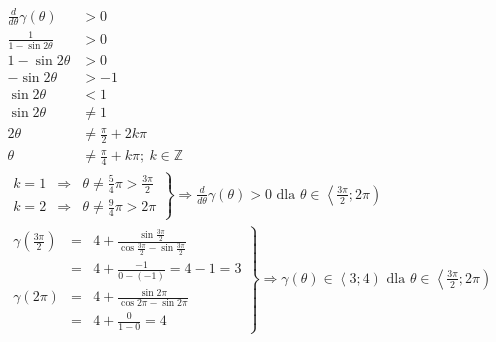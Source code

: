         \begin{align*}
        	\frac{d}{d\theta}\gamma\left( \theta\right)& > 0& \hspace{10cm}\\
        	\frac{
        		1
        	}{
        		1 - \sin 2\theta
        	} & > 0\\
        	1 - \sin 2\theta & > 0\\
        	 -\sin 2\theta & > -1\\
        	 \sin 2\theta & < 1\\
        	 \sin 2\theta & \neq 1\\
        	 2\theta & \neq \frac{\pi}{2} + 2k\pi\\
        	 \theta & \neq \frac{\pi}{4} + k\pi ; \ k \in \mathbb{Z}
        \end{align*}\alignspace
       	\begin{align*}
       		\left. \begin{array}{rcl}
       		 k = 1 & \Rightarrow &\theta \neq \frac{5}{4}\pi > \frac{3\pi}{2}  \\
    	 	 k = 2 & \Rightarrow &\theta \neq \frac{9}{4}\pi > 2\pi
    	 	\end{array}    \right\}\Rightarrow \frac{d}{d\theta}\gamma\left( \theta\right) > 0 \text{ dla } \theta \in \left\langle \frac{3\pi}{2};2\pi\right)& \hspace{10cm}
        \end{align*}\alignspace
       	\begin{align*}
       	\left. \begin{array}{rcl}
       		\gamma\left( \frac{3\pi}{2}\right) & = &
       		 4 + \frac{\sin \frac{3\pi}{2}}{\cos\frac{3\pi}{2} - \sin \frac{3\pi}{2}}\\
       		  & = & 4 + \frac{-1}{0 - \left(-1\right)}= 4 - 1 = 3\\
       		\gamma\left( 2\pi\right) & = &
       		4 + \frac{\sin  2\pi}{\cos  2\pi - \sin 2\pi} \\
       		& = &4 + \frac{0}{1 - 0} = 4
       	\end{array} \right\} \Rightarrow \gamma\left( \theta\right) \in \left\langle 3;4\right) \text{ dla } \theta \in\left\langle \frac{3\pi}{2};2\pi\right)& \hspace{10cm}
        \end{align*}